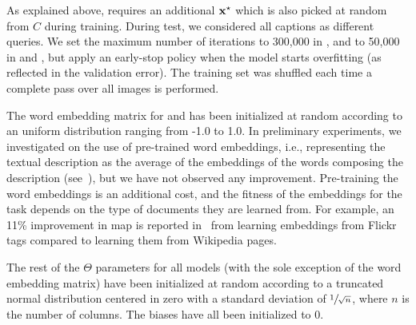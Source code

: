 As explained above, \sparsettv{} requires an additional $\mathbf{x}^\star$ which is also picked at random from $C$ during training.
During test, we considered all captions as different queries.
We set the maximum number of iterations to 300,000 in \sparsettv{}, and to 50,000 in \densettv{} and \widedeepttv{}, but apply an early-stop policy when the model starts overfitting (as reflected in the validation error).
The training set was shuffled each time a complete pass over all images is performed.

The word embedding matrix for \densettv{} and \widedeepttv{} has been initialized at random according to an uniform distribution ranging from -1.0 to 1.0.
In preliminary experiments, we investigated on the use of pre-trained word embeddings, i.e.,  representing the textual description as the average of the embeddings of the words composing the description (see~\cite{dong2018predicting}), but we have not observed any improvement.
Pre-training the word embeddings is an additional cost, and the fitness of the embeddings for the task depends on the type of documents they are learned from.
For example, an 11\% improvement in \gls{map} is reported in~\cite{cappallo2015image2emoji} from learning embeddings from Flickr tags compared to learning them from Wikipedia pages.

The rest of the $\Theta$ parameters for all models (with the sole exception of the word embedding matrix) have been initialized at random according to a truncated normal distribution centered in zero with a standard deviation of $\sfrac{1}{\sqrt{n}}$, where $n$ is the number of columns.
The biases have all been initialized to 0.

